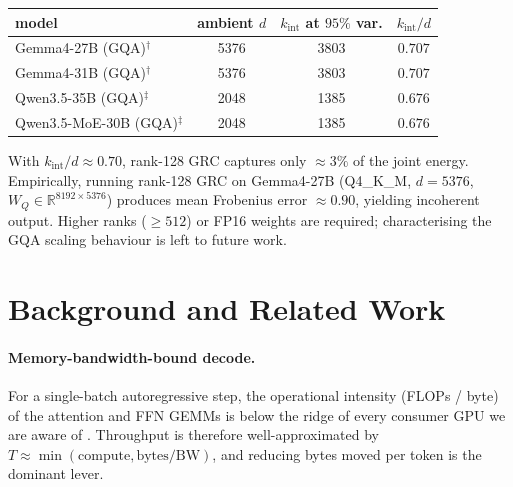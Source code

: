 \documentclass[11pt]{article}
\begin{document}
\begin{center}\small
\begin{tabular}{lccc}\toprule
model & ambient $d$ & $k_{\mathrm{int}}$ at $95\%$ var. & $k_{\mathrm{int}}/d$\\\midrule
Gemma4-27B (GQA)$^\dagger$       & 5376 & 3803 & $0.707$\\
Gemma4-31B (GQA)$^\dagger$       & 5376 & 3803 & $0.707$\\
Qwen3.5-35B (GQA)$^\ddagger$     & 2048 & 1385 & $0.676$\\
Qwen3.5-MoE-30B (GQA)$^\ddagger$ & 2048 & 1385 & $0.676$\\\bottomrule
\end{tabular}\end{center}
\smallskip{}

With $k_{\mathrm{int}}/d\approx0.70$, rank-128 GRC captures only $\approx3\%$
of the joint energy. Empirically, running rank-128 GRC on Gemma4-27B
(Q4\_K\_M, $d{=}5376$, $W_Q\!\in\!\mathbb{R}^{8192\times5376}$) produces
mean Frobenius error $\approx0.90$, yielding incoherent output.
Higher ranks (${\geq}512$) or FP16 weights are required; characterising the
GQA scaling behaviour is left to future work.
\FloatBarrier
\section{Background and Related Work}
\label{sec:background}

\paragraph{Memory-bandwidth-bound decode.}
For a single-batch autoregressive step, the operational intensity (FLOPs /
byte) of the attention and FFN GEMMs is below the ridge of every consumer GPU
we are aware of \cite{yuan2024llmroofline,nvidia2022ada}.  Throughput is
therefore well-approximated by
$T \approx \min(\text{compute}, \text{bytes}/\text{BW})$, and reducing bytes
moved per token is the dominant lever.
\end{document}
